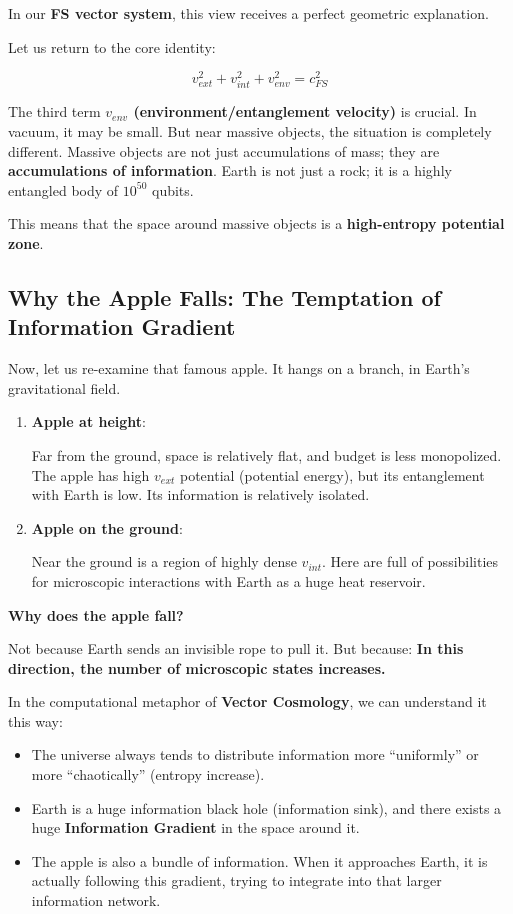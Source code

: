 In our \textbf{FS vector system}, this view receives a perfect geometric explanation.

Let us return to the core identity:

\[v_{ext}^2 + v_{int}^2 + v_{env}^2 = c_{FS}^2\]

The third term \textbf{$v_{env}$ (environment/entanglement velocity)} is crucial. In vacuum, it may be small. But near massive objects, the situation is completely different. Massive objects are not just accumulations of mass; they are \textbf{accumulations of information}. Earth is not just a rock; it is a highly entangled body of $10^{50}$ qubits.

This means that the space around massive objects is a \textbf{high-entropy potential zone}.

\subsection{Why the Apple Falls: The Temptation of Information Gradient}

Now, let us re-examine that famous apple. It hangs on a branch, in Earth's gravitational field.

\begin{enumerate}
\item \textbf{Apple at height}:

    Far from the ground, space is relatively flat, and budget is less monopolized. The apple has high $v_{ext}$ potential (potential energy), but its entanglement with Earth is low. Its information is relatively isolated.

\item \textbf{Apple on the ground}:

    Near the ground is a region of highly dense $v_{int}$. Here are full of possibilities for microscopic interactions with Earth as a huge heat reservoir.
\end{enumerate}

\textbf{Why does the apple fall?}

Not because Earth sends an invisible rope to pull it. But because: \textbf{In this direction, the number of microscopic states increases.}

In the computational metaphor of \textbf{Vector Cosmology}, we can understand it this way:

\begin{itemize}
\item The universe always tends to distribute information more ``uniformly'' or more ``chaotically'' (entropy increase).

\item Earth is a huge information black hole (information sink), and there exists a huge \textbf{Information Gradient} in the space around it.

\item The apple is also a bundle of information. When it approaches Earth, it is actually following this gradient, trying to integrate into that larger information network.
\end{itemize}

